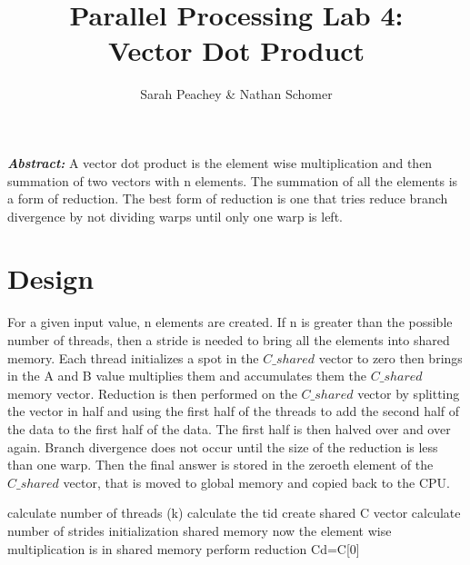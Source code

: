 \documentclass[12pt]{article}
\begin{document}
\title{Parallel Processing Lab 4: \\Vector Dot Product}
\author{Sarah Peachey \& Nathan Schomer}
\maketitle


\textbf{\textit{Abstract:}} A vector dot product is the element wise
multiplication and then summation of two vectors with n elements. The
summation of all the elements is a form of reduction. The best form of
reduction is one that tries reduce branch divergence by not dividing warps
until only one warp is left.  
\newpage

\vspace{-1.5cm}
\section{Design}
\vspace{-0.25cm}


\qquad For a given input value, n elements are created. If n is greater than
the possible number of threads, then a stride is needed to bring all the
elements into shared memory. Each thread initializes a spot in the
$C\_shared$
vector to zero then brings in the A and B value multiplies them and
accumulates them the $C\_shared$ memory vector. Reduction is then performed on
the $C\_shared$ vector by splitting the vector in half and using the first
half of the threads to add the second half of the data to the first half of
the data. The first half is then halved over and over again. Branch
divergence does not occur until the size of the reduction is less than one
warp. Then the final answer is stored in the zeroeth element of the
$C\_shared$
vector, that is moved to global memory and copied back to the CPU. 

\vspace{1cm}
\begin{algorithm}[H]
 	calculate number of threads (k)\; 
	calculate the tid\; 
	create shared C vector\; 
	calculate number of strides\; 
	initialization shared memory\;
	now the element wise multiplication is in shared memory\;
	perform reduction\;
	Cd=C[0]\;
\end{algorithm}
\end{document}
